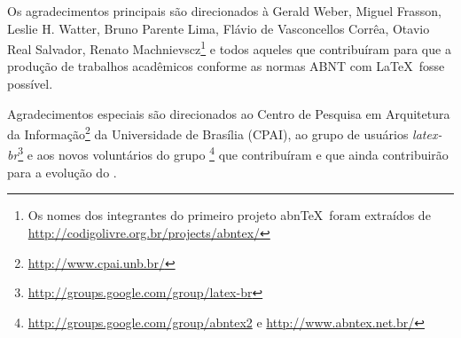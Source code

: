 
\begin{agradecimentos}

    Os agradecimentos principais são direcionados à Gerald Weber, Miguel Frasson, Leslie H. Watter, Bruno Parente Lima, Flávio de Vasconcellos Corrêa, Otavio Real Salvador, Renato Machnievscz\footnote{%
        Os nomes dos integrantes do primeiro projeto abn\TeX\ foram extraídos de \url{http://codigolivre.org.br/projects/abntex/}
    }
    e todos aqueles que contribuíram para que a produção de trabalhos acadêmicos conforme as normas ABNT com \LaTeX\ fosse possível.

    Agradecimentos especiais são direcionados ao Centro de Pesquisa em Arquitetura da Informação\footnote{%
        \url{http://www.cpai.unb.br/}
    }
    da Universidade de Brasília (CPAI), ao grupo de usuários \emph{latex-br}\footnote{%
        \url{http://groups.google.com/group/latex-br}
    }
    e aos novos voluntários do grupo \emph{\abnTeX}\footnote{%
        \url{http://groups.google.com/group/abntex2} e \url{http://www.abntex.net.br/}
    }
    que contribuíram e que ainda contribuirão para a evolução do \abnTeX.

\end{agradecimentos}

